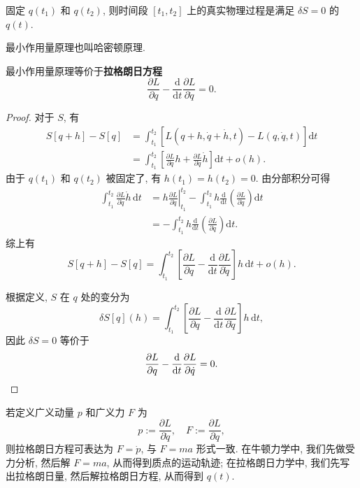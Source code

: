\begin{axiom}[最小作用量原理]
    固定 $ q(t_1) $ 和 $ q(t_2) $, 则时间段 $ [t_1,t_2] $ 上的真实物理过程是满足 $ \delta S=0 $ 的 $ q(t) $.
\end{axiom}
\begin{remark}
    最小作用量原理也叫哈密顿原理. 
\end{remark}
\begin{theorem}[拉格朗日方程]
    最小作用量原理等价于{\bf 拉格朗日方程}
    \[ \frac{\partial L}{\partial q}-\frac{\mathrm{d}}{\mathrm{d}t}\frac{\partial L}{\partial\dot{q}}=0. \]
\end{theorem}
\begin{proof}
对于 $ S $, 有
\begin{align*}
    S[q+h]-S[q] &= \int_{t_1}^{t_2}\left[ L(q+h,\dot{q}+\dot{h},t)-L(q,\dot{q},t) \right]\mathrm{d}t\\ 
    &=\int_{t_1}^{t_2}\left[ \frac{\partial L}{\partial q}h+\frac{\partial L}{\partial\dot{q}}\dot{h} \right]\mathrm{d}t+o(h).
\end{align*}
由于 $ q(t_1) $ 和 $ q(t_2) $ 被固定了, 有 $ h(t_1)=h(t_2)=0 $. 由分部积分可得
\begin{align*}
    \int_{t_1}^{t_2}\frac{\partial L}{\partial\dot{q}}\dot{h}\,\mathrm{d}t &= \left.h\frac{\partial L}{\partial\dot{q}}\right|_{t_1}^{t_2}-\int_{t_1}^{t_2}h\frac{\mathrm{d}}{\mathrm{d}t}\left( \frac{\partial L}{\partial\dot{q}} \right)\mathrm{d}t\\ 
    &=-\int_{t_1}^{t_2}h\frac{\mathrm{d}}{\mathrm{d}t}\left( \frac{\partial L}{\partial\dot{q}} \right)\mathrm{d}t.
\end{align*}
综上有
\[ S[q+h]-S[q]=\int_{t_1}^{t_2}\left[ \frac{\partial L}{\partial q}-\frac{\mathrm{d}}{\mathrm{d}t}\frac{\partial L}{\partial\dot{q}} \right] h\,\mathrm{d}t + o(h). \]

根据定义, $ S $ 在 $ q $ 处的变分为
\[ \delta S[q](h) = \int_{t_1}^{t_2}\left[ \frac{\partial L}{\partial q}-\frac{\mathrm{d}}{\mathrm{d}t}\frac{\partial L}{\partial\dot{q}} \right] h\,\mathrm{d}t, \]
因此 $ \delta S=0 $ 等价于 
\[ \frac{\partial L}{\partial q}-\frac{\mathrm{d}}{\mathrm{d}t}\frac{\partial L}{\partial\dot{q}}=0. \qedhere\]
\end{proof}

若定义广义动量 $p$ 和广义力 $F$ 为
\[ p:=\frac{\partial L}{\partial\dot{q}},\quad F:=\frac{\partial L}{\partial q}, \] 
则拉格朗日方程可表达为 $ F=\dot{p} $, 与 $F=ma$ 形式一致. 在牛顿力学中, 我们先做受力分析, 然后解 $ F=ma $, 从而得到质点的运动轨迹; 在拉格朗日力学中, 我们先写出拉格朗日量, 然后解拉格朗日方程, 从而得到 $ q(t) $.

